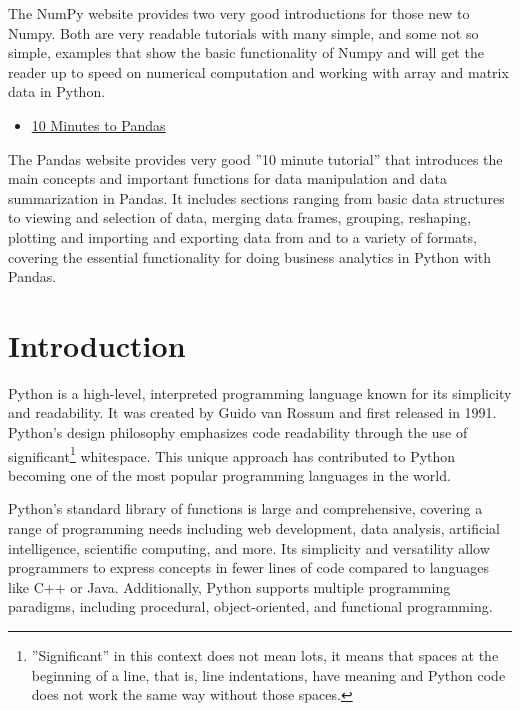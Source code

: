 The NumPy website provides two very good introductions for those new to Numpy. Both are very readable tutorials with many simple, and some not so simple, examples that show the basic functionality of Numpy and will get the reader up to speed on numerical computation and working with array and matrix data in Python.

\begin{tcolorbox}[colback=alert]
\begin{itemize}
\item \href{http://pandas.pydata.org/docs/user_guide/10min.html}{10 Minutes to Pandas}
\end{itemize}
\end{tcolorbox}

The Pandas website provides very good ''10 minute tutorial'' that introduces the main concepts and important functions for data manipulation and data summarization in Pandas. It includes sections ranging from basic data structures to viewing and selection of data, merging data frames, grouping, reshaping, plotting and importing and exporting data from and to a variety of formats, covering the essential functionality for doing business analytics in Python with Pandas.


\section{Introduction}

Python is a high-level, interpreted programming language known for its simplicity and readability. It was created by Guido van Rossum and first released in 1991. Python's design philosophy emphasizes code readability through the use of significant\footnote{''Significant'' in this context does not mean lots, it means that spaces at the beginning of a line, that is, line indentations, have meaning and Python code does not work the same way without those spaces.} whitespace. This unique approach has contributed to Python becoming one of the most popular programming languages in the world.

Python's standard library of functions is large and comprehensive, covering a range of programming needs including web development, data analysis, artificial intelligence, scientific computing, and more. Its simplicity and versatility allow programmers to express concepts in fewer lines of code compared to languages like C++ or Java. Additionally, Python supports multiple programming paradigms, including procedural, object-oriented, and functional programming.

